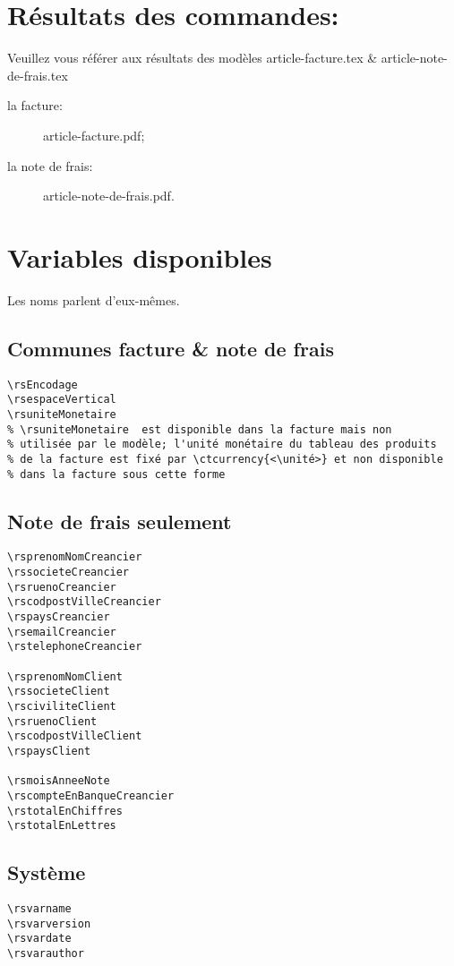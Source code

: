 \documentclass[a4paper,10pt]{article}
\begin{document}
\section{Résultats des commandes:} 
Veuillez vous référer aux résultats des modèles article-facture.tex \& article-note-de-frais.tex
\begin{description}
    \item [la facture:] article-facture.pdf;
    \item [la note de frais:] article-note-de-frais.pdf.
\end{description}


\section{Variables disponibles}

Les noms parlent d'eux-mêmes.

\subsection{Communes facture \& note de frais}
\begin{lstlisting}
\rsEncodage
\rsespaceVertical
\rsuniteMonetaire 
% \rsuniteMonetaire  est disponible dans la facture mais non 
% utilisée par le modèle; l'unité monétaire du tableau des produits 
% de la facture est fixé par \ctcurrency{<\unité>} et non disponible 
% dans la facture sous cette forme
\end{lstlisting}

\subsection{Note de frais seulement}
\begin{lstlisting}
\rsprenomNomCreancier
\rssocieteCreancier
\rsruenoCreancier
\rscodpostVilleCreancier
\rspaysCreancier
\rsemailCreancier
\rstelephoneCreancier

\rsprenomNomClient
\rssocieteClient
\rsciviliteClient
\rsruenoClient
\rscodpostVilleClient
\rspaysClient

\rsmoisAnneeNote
\rscompteEnBanqueCreancier
\rstotalEnChiffres
\rstotalEnLettres
\end{lstlisting}

\subsection{Système}
\begin{lstlisting}
\rsvarname
\rsvarversion
\rsvardate
\rsvarauthor
\end{lstlisting}
\end{document}
